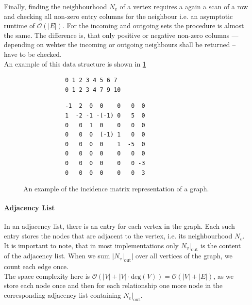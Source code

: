         Finally, finding the neighbourhood $N_v$ of a vertex requires a again a scan of a row and checking all non-zero entry columns for the neighbour i.e. an asymptotic runtime of $\mathcal{O}(|E|)$. 
        For the incoming and outgoing sets the procedure is almost the same. The difference is, that only positive or negative non-zero columns --- depending on wehter the incoming or outgoing neighbours shall be returned -- have to be checked.\\
        
        An example of this data structure is shown in \ref{incm}
        
        \begin{figure}[htp]
         \begin{center}
         \begin{verbatim}
            0 1 2 3 4 5 6 7
            0 1 2 3 4 7 9 10
          \end{verbatim}
          \begin{verbatim}
            -1  2  0  0    0   0  0
            1  -2 -1 -(-1) 0   5  0
            0   0  1  0    0   0  0
            0   0  0  (-1) 1   0  0
            0   0  0  0    1  -5  0
            0   0  0  0    0   0  0
            0   0  0  0    0   0 -3
            0   0  0  0    0   0  3
          \end{verbatim}
         \end{center}
         \caption{An example of the incidence matrix representation of a graph.}
         \label{incm}
        \end{figure}
        
        \paragraph{Adjacency List}
        In an adjacency list, there is an entry for each vertex in the graph. 
        Each such entry stores the nodes that are adjacent to the vertex, i.e. its neighbourhood $N_v$. 
        It is important to note, that in most implementations only $N_v |_\text{out}$ is the content of the adjacency list.
        When we sum $|N_v |_\text{out}|$ over all vertices of the graph, we count each edge once. \\
        The space complexity here is $\mathcal{O}(|V| + |V| \cdot \text{deg}(V)) = \mathcal{O}(|V| + |E|)$, as we store each node once and then for each relationship one more node in the corresponding adjacency list containing $N_v |_\text{out}$.

